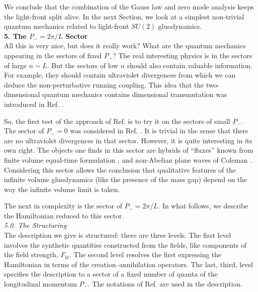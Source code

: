 \documentclass[a4paper,12pt]{article}
\begin{document}
We conclude that the combination of the Gauss law and 
zero mode analysis keeps the light-front split alive. 
In the next Section, we look at a simplest non-trivial 
quantum mechanics related to light-front $SU(2)$ gluodynamics.\\

{\bf 5. The $P_- = 2\pi/L$ Sector }\\

All this is very nice, but does it really work? 
What are the quantum mechanics appearing in the sectors 
of fixed $P_-$? The real interesting physics is in the 
sectors of large $n\sim L$. But the sectors of low $n$ 
should also contain valuable information. For example, 
they should contain ultraviolet divergences 
from which we can deduce the non-perturbative 
running coupling. This idea that the two-dimensional
quantum mechanics contains dimensional transmutation
was introduced in Ref. \cite{Thorn}.

So, the first test of the approach of Ref. \cite{KMPV} is to try it 
on the sectors of small 
$P_-$. The sector of 
$P_{-} = 0$  was considered in Ref. \cite{KMPV}. 
It is trivial in the sense that there are no 
ultraviolet divergences
in that sector. However, it is quite interesting 
in its own right. The objects one finds in this sector are hybrids of
``fluxes'' known from finite volume equal-time formulation \cite{tHooft},
and non-Abelian plane waves of Coleman \cite{Col}. Considering this
sector allows the 
conclusion that qualitative features of the
infinite volume gluodynamics (like the presence of the mass gap) 
depend on the way the infinite volume limit is taken.

The next in complexity is the sector of $P_- = 2\pi/L$. 
In what follows, we describe the Hamiltonian 
reduced to this sector.\\


{\it 5.0. The Structuring }\\

The description we give is structured: there are three levels.
The first level involves the synthetic quantities constructed from
the fields, like components of the field strength, $F_{kl}$.   
The second level resolves the first expressing the Hamiltonian
in terms of the creation--annihilation operators. The last, third, level
specifies the description to a sector of a fixed number of quanta of the
longitudinal momentum $P_-$. The notations of 
Ref. \cite{KMPV} are used in the 
description.\\
\end{document}
